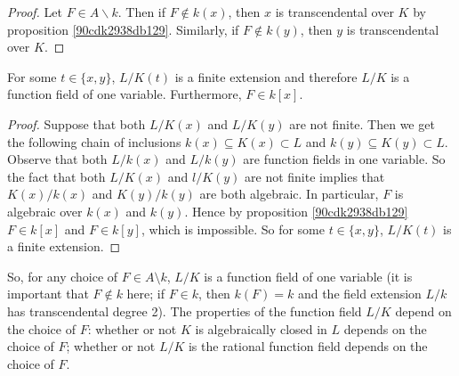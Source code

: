 \begin{proof}
Let $F \in A \backslash  k$. Then if $F \notin  k(x)$, then $x$ is 
transcendental over $K$ by proposition \ref{90cdk2938db129}. Similarly, 
if $F\notin  k(y)$, then $y$ is transcendental over $K$. 
\end{proof}

\begin{proposition}
For some $t \in \{x,y\}$, $L/K(t)$ is a finite extension and therefore
$L/K$ is a function field of one variable.
Furthermore, $F \in  k[x]$.
\end{proposition}

\begin{proof}
Suppose that both $L/K(x)$ and $L/K(y)$ are not finite. Then we get the following
chain of inclusions $ k(x) \subseteq K(x) \subset L$ and $ k(y) \subseteq K(y) \subset L$. 
Observe that both $L/ k(x)$ and $L/ k(y)$ are function fields in one 
variable. So the fact that both $L/K(x)$ and $l/K(y)$ are not finite implies 
that $K(x)/ k(x)$ and $K(y)/ k(y)$ are both algebraic. In particular,
$F$ is algebraic over $ k(x)$ and $ k(y)$. Hence by proposition \ref{90cdk2938db129}
$F\in  k[x]$ and $F\in  k[y]$, which is impossible. So for some $t \in \{x,y\}$, $L/K(t)$ is a finite extension.
\end{proof}

\begin{remark}
So, for any choice of $F \in A \setminus  k$, $L/K$ is a function field of one variable
(it is important that $F \notin  k$ here; 
if $F \in  k$, then $ k(F)= k$ and the field extension $L/ k$ has transcendental degree 2).
The properties of the function field $L/K$ depend on the choice of $F$:
whether or not $K$ is algebraically closed in $L$ depends on the choice of $F$;
whether or not $L/K$ is the rational function field depends on the choice of $F$.
\end{remark}

